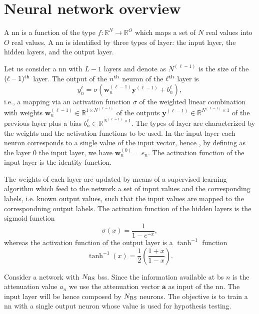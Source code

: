 \documentclass[draftcls,onecolumn,12pt]{IEEEtran}
\begin{document}
\section{Neural network overview}\label{sec:nn}

A \ac{nn} is a function of the type $f:\mathbb{R}^N \to \mathbb{R}^O$ which maps a set of $N$ real values into $O$ real values. A \ac{nn} is identified by three types of layer: the input layer, the hidden layers, and the output layer. 

Let us consider a \ac{nn} with $L-1$ layers and denote as $N^{(\ell-1)}$ is the size of the $(\ell-1)^{\rm th}$ layer. The output of the $n^{\rm th}$ neuron of the $\ell^{\rm th}$ layer is
\begin{equation}\label{eq:nonLin}
y_n^{\ell} = \sigma\left( \bm{w}_n^{(\ell -1)}\bm{y}^{(\ell-1)}+b_n^{\ell} \right),
\end{equation}
i.e., a mapping via an activation function $\sigma$ of the weighted linear combination with weights $\bm{w}_n^{(\ell -1)}\in \mathbb{R}^{1\times N^{(\ell-1)}}$ of the outputs $\bm{y}^{(\ell-1)} \in \mathbb{R}^{N^{(\ell-1)} \times 1 }$ of the previous layer plus a bias $b_n^{\ell} \in \mathbb{R}^{N^{(\ell-1)} \times 1 }$. The types of layer are characterized by the weights and the activation functions to be used. In the input layer each neuron corresponds to a single value of the input vector, hence , by defining as the layer $0$ the input layer, we have $\bm{w}_n^{(0)}= e_n$. The activation function of the input layer is the identity function.

The weights of each layer are updated by means of a supervised learning algorithm which feed to the network a set of input values and the corresponding labels, i.e. known output values, such that the input values are mapped to the correspondning output labels. The activation function of the hidden layers is the sigmoid function
\begin{equation}
\sigma(x) = \frac{1}{1-e^{-x}},
\end{equation}
whereas the activation function of the output layer is a $\tanh^{-1}$ function
\begin{equation}
\tanh^{-1}(x) = \frac{1}{2} \left( \frac{1+x}{1-x} \right).
\end{equation}


Consider a network with $N_{\rm BS}$ \acp{bs}. Since the information available at \ac{bs} $n$ is the attenuation value $a_n$ we use the attenuation vector $\bm{a}$ as input of the \ac{nn}. The input layer will be hence composed by $N_{\rm BS}$ neurons. The objective is to train a \ac{nn} with a single output neuron whose value is used for hypothesis testing. 
\end{document}
